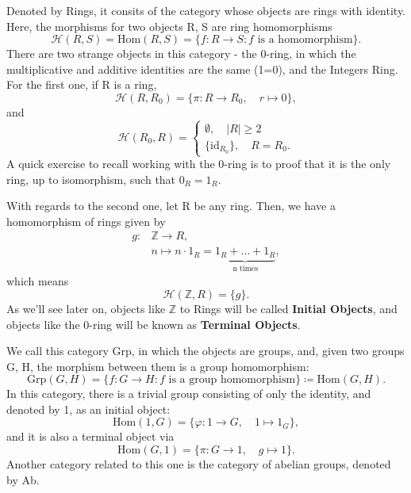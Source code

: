 \documentclass[../category_theory.tex]{subfiles}
\begin{document}
\begin{example}
	Denoted by Rings, it consits of the category whose objects are rings with identity. Here, the morphisms for two objects R, S are ring homomorphisms
	\[
		\mathcal{H}(R, S)=\mathrm{Hom}(R, S)=\{f:R\rightarrow S: f \text{ is a homomorphism}\}.
	\]
	There are two strange objects in this category - the 0-ring, in which the multiplicative and additive identities are the same (1=0), and the Integers Ring. For the first one, if R is a ring,
	\[
		\mathcal{H}(R, R_{0})=\{\pi :R\rightarrow R_{0},\quad r\mapsto 0\},
	\]
	and
	\[
		\mathcal{H}(R_{0}, R)  = \left\{\begin{array}{ll}
			\emptyset ,\quad |R|\geq 2 \\
			\{\mathrm{id}_{R_{0}}\},\quad R=R_{0}.
		\end{array}\right.
	\]
	A quick exercise to recall working with the 0-ring is to proof that it is the only ring, up to isomorphism, such that \(0_{R}=1_{R}.\)

	With regards to the second one, let R be any ring. Then, we have a homomorphism of rings given by
	\begin{align*}
		g: & \mathbb{Z}\rightarrow R,                                                  \\
		   & n\mapsto n \cdot 1_{R}=\underbrace{1_{R}+\dotsc +1_{R}}_{\text{n times}},
	\end{align*}
	which means
	\[
		\mathcal{H}(\mathbb{Z},R)=\{g\}.
	\]
	As we'll see later on, objects like \(\mathbb{Z}\) to Rings will be called \textbf{Initial Objects}, and objects like the 0-ring will be known as \textbf{Terminal Objects}.
\end{example}
\begin{example}
	We call this category Grp, in which the objects are groups, and, given two groups G, H, the morphism between them is a group homomorphism:
	\[
		\mathrm{Grp}(G, H)=\{f:G\rightarrow H: f \text{ is a group homomorphism}\}\coloneqq \mathrm{Hom}(G, H).
	\]
	In this category, there is a trivial group consisting of only the identity, and denoted by 1, as an initial object:
	\[
		\mathrm{Hom}(1,G)=\{\varphi : 1\rightarrow G,\quad 1\mapsto 1_{G} \},
	\]
	and it is also a terminal object via
	\[
		\mathrm{Hom}(G, 1)=\{\pi : G\rightarrow 1, \quad g\mapsto 1\}.
	\]
	Another category related to this one is the category of abelian groups, denoted by Ab.
\end{example}
\end{document}
